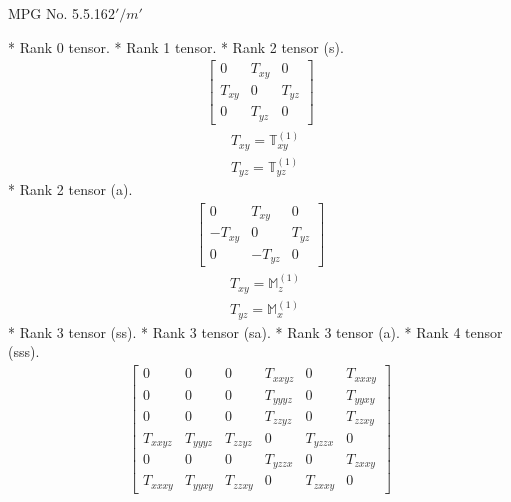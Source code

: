 \documentclass[fleqn,8pt,landscape]{jsarticle}
\begin{document}
\setcounter{MaxMatrixCols}{32}

\renewcommand{\tablename}{Table~}
\renewcommand{\figurename}{Figure~}
\begin{center}
\LARGE
MPG No. 5.5.16\quad$2'/m'$
\end{center}
* Rank 0 tensor.
* Rank 1 tensor.
* Rank 2 tensor (s).
\begin{align*}
\begin{bmatrix} 0 & T_{xy} & 0 \\ T_{xy} & 0 & T_{yz} \\ 0 & T_{yz} & 0 \end{bmatrix}
\end{align*}
\begin{align*}
& T_{xy} = \mathbb{T}_{xy}^{(1)} \\
& T_{yz} = \mathbb{T}_{yz}^{(1)}
\end{align*}
* Rank 2 tensor (a).
\begin{align*}
\begin{bmatrix} 0 & T_{xy} & 0 \\ - T_{xy} & 0 & T_{yz} \\ 0 & - T_{yz} & 0 \end{bmatrix}
\end{align*}
\begin{align*}
& T_{xy} = \mathbb{M}_{z}^{(1)} \\
& T_{yz} = \mathbb{M}_{x}^{(1)}
\end{align*}
* Rank 3 tensor (ss).
* Rank 3 tensor (sa).
* Rank 3 tensor (a).
* Rank 4 tensor (sss).
\begin{align*}
\begin{bmatrix} 0 & 0 & 0 & T_{xxyz} & 0 & T_{xxxy} \\ 0 & 0 & 0 & T_{yyyz} & 0 & T_{yyxy} \\ 0 & 0 & 0 & T_{zzyz} & 0 & T_{zzxy} \\ T_{xxyz} & T_{yyyz} & T_{zzyz} & 0 & T_{yzzx} & 0 \\ 0 & 0 & 0 & T_{yzzx} & 0 & T_{zxxy} \\ T_{xxxy} & T_{yyxy} & T_{zzxy} & 0 & T_{zxxy} & 0 \end{bmatrix}
\end{align*}
\end{document}
